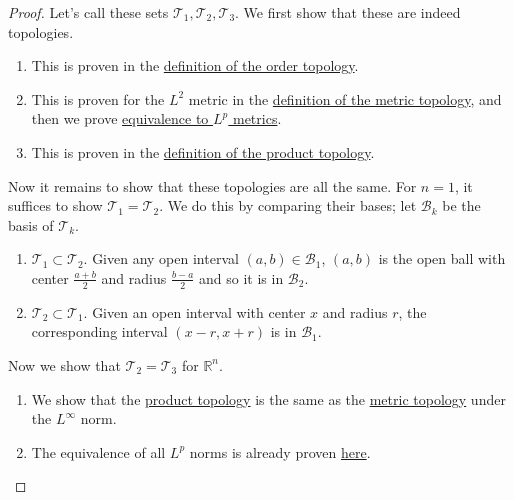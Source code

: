   \begin{proof} 
    Let's call these sets $\mathscr{T}_1, \mathscr{T}_2, \mathscr{T}_3$. We first show that these are indeed topologies. 
    \begin{enumerate}
      \item This is proven in the \hyperref[pst-def:order-topology]{definition of the order topology}. 
      \item This is proven for the $L^2$ metric in the \hyperref[pst-def:metric-topology]{definition of the metric topology}, and then we prove \hyperref[pst-thm:lp-norms-euclidean-topology]{equivalence to $L^p$ metrics}. 
      \item This is proven in the \hyperref[pst-def:product-topology]{definition of the product topology}. 
    \end{enumerate}

    Now it remains to show that these topologies are all the same. For $n=1$, it suffices to show $\mathscr{T}_1 = \mathscr{T}_2$. We do this by comparing their bases; let $\mathscr{B}_k$ be the basis of $\mathscr{T}_k$. 
    \begin{enumerate}
      \item $\mathscr{T}_1 \subset \mathscr{T}_2$. Given any open interval $(a, b) \in \mathscr{B}_1$, $(a, b)$ is the open ball with center $\frac{a + b}{2}$ and radius $\frac{b - a}{2}$ and so it is in $\mathscr{B}_2$. 
      \item $\mathscr{T}_2 \subset \mathscr{T}_1$. Given an open interval with center $x$ and radius $r$, the corresponding interval $(x - r, x + r)$ is in $\mathscr{B}_1$. 
    \end{enumerate}
    Now we show that $\mathscr{T}_2 = \mathscr{T}_3$ for $\mathbb{R}^n$. 
    \begin{enumerate}
      \item We show that the \hyperref[pst-def:product-topology]{product topology} is the same as the \hyperref[pst-def:metric-topology]{metric topology} under the $L^\infty$ norm. 
      \item The equivalence of all $L^p$ norms is already proven \hyperref[pst-thm:lp-norms-euclidean-topology]{here}. 
    \end{enumerate}
  \end{proof}

